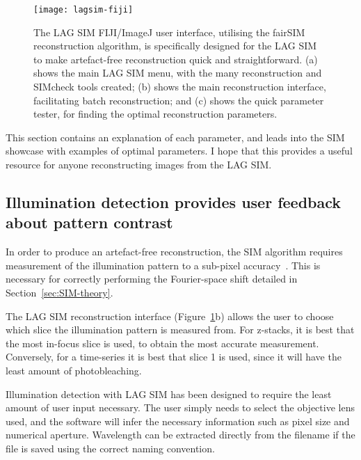 \begin{figure}[htbp!]
	\centering
		\texttt{[image: lagsim-fiji]}	
	\caption[LAG SIM: A Fiji interface makes artefact-free reconstruction quick and simple for non-expert users]{The LAG SIM FIJI/ImageJ user interface, utilising the fairSIM reconstruction algorithm, is specifically designed for the LAG SIM to make artefact-free reconstruction quick and straightforward. (a) shows the main LAG SIM menu, with the many reconstruction and SIMcheck tools created; (b) shows the main reconstruction interface, facilitating batch reconstruction; and (c) shows the quick parameter tester, for finding the optimal reconstruction parameters. } %
\label{fig:lagsim-fiji-interface}
\end{figure}

This section contains an explanation of each parameter, and leads into the SIM showcase with examples of optimal parameters.
I hope that this provides a useful resource for anyone reconstructing images from the LAG SIM. 

\subsection{Illumination detection provides user feedback about pattern contrast}
In order to produce an artefact-free reconstruction, the SIM algorithm requires measurement of the illumination pattern to a sub-pixel accuracy~\cite{muller2016open}. 
This is necessary for correctly performing the Fourier-space shift detailed in Section~\ref{sec:SIM-theory}. 

The LAG SIM reconstruction interface (Figure~\ref{fig:lagsim-fiji-interface}b) allows the user to choose which slice the illumination pattern is measured from. 
For z-stacks, it is best that the most in-focus slice is used, to obtain the most accurate measurement. 
Conversely, for a time-series it is best that slice 1 is used, since it will have the least amount of photobleaching. 

Illumination detection with LAG SIM has been designed to require the least amount of user input necessary. 
The user simply needs to select the objective lens used, and the software will infer the necessary information such as pixel size and numerical aperture. 
Wavelength can be extracted directly from the filename if the file is saved using the correct naming convention. 

